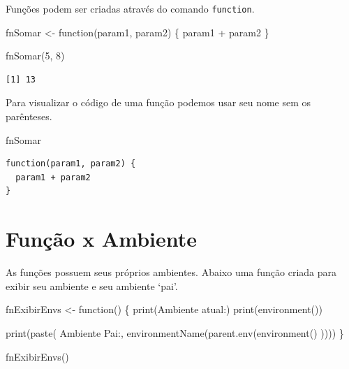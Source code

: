\documentclass[
  letterpaper,
  DIV=11,
  numbers=noendperiod]{scrreprt}
\newenvironment{Shaded}{\begin{snugshade}}{\end{snugshade}}
\newcommand{\ControlFlowTok}[1]{\textcolor[rgb]{0.00,0.23,0.31}{#1}}
\newcommand{\DecValTok}[1]{\textcolor[rgb]{0.68,0.00,0.00}{#1}}
\newcommand{\FunctionTok}[1]{\textcolor[rgb]{0.28,0.35,0.67}{#1}}
\newcommand{\NormalTok}[1]{\textcolor[rgb]{0.00,0.23,0.31}{#1}}
\newcommand{\OtherTok}[1]{\textcolor[rgb]{0.00,0.23,0.31}{#1}}
\newcommand{\SpecialCharTok}[1]{\textcolor[rgb]{0.37,0.37,0.37}{#1}}
\newcommand{\StringTok}[1]{\textcolor[rgb]{0.13,0.47,0.30}{#1}}
\begin{document}
Funções podem ser criadas através do comando \texttt{function}.

\begin{Shaded}
\begin{Highlighting}[]
\NormalTok{fnSomar }\OtherTok{\textless{}{-}} \ControlFlowTok{function}\NormalTok{(param1, param2) \{}
\NormalTok{  param1 }\SpecialCharTok{+}\NormalTok{ param2}
\NormalTok{\}}

\FunctionTok{fnSomar}\NormalTok{(}\DecValTok{5}\NormalTok{, }\DecValTok{8}\NormalTok{)}
\end{Highlighting}
\end{Shaded}

\begin{verbatim}
[1] 13
\end{verbatim}

Para visualizar o código de uma função podemos usar seu nome sem os
parênteses.

\begin{Shaded}
\begin{Highlighting}[]
\NormalTok{fnSomar}
\end{Highlighting}
\end{Shaded}

\begin{verbatim}
function(param1, param2) {
  param1 + param2
}
\end{verbatim}

\hypertarget{funuxe7uxe3o-x-ambiente}{%
\section{Função x Ambiente}\label{funuxe7uxe3o-x-ambiente}}

As funções possuem seus próprios ambientes. Abaixo uma função criada
para exibir seu ambiente e seu ambiente `pai'.

\begin{Shaded}
\begin{Highlighting}[]
\NormalTok{fnExibirEnvs }\OtherTok{\textless{}{-}} \ControlFlowTok{function}\NormalTok{() \{}
  \FunctionTok{print}\NormalTok{(}\StringTok{\textquotesingle{}Ambiente atual:\textquotesingle{}}\NormalTok{)}
  \FunctionTok{print}\NormalTok{(}\FunctionTok{environment}\NormalTok{())}
  
  \FunctionTok{print}\NormalTok{(}\FunctionTok{paste}\NormalTok{(}
    \StringTok{\textquotesingle{}Ambiente Pai:\textquotesingle{}}\NormalTok{, }
    \FunctionTok{environmentName}\NormalTok{(}\FunctionTok{parent.env}\NormalTok{(}\FunctionTok{environment}\NormalTok{()}
\NormalTok{                               ))))}
\NormalTok{\}}

\FunctionTok{fnExibirEnvs}\NormalTok{()}
\end{Highlighting}
\end{Shaded}
\end{document}

